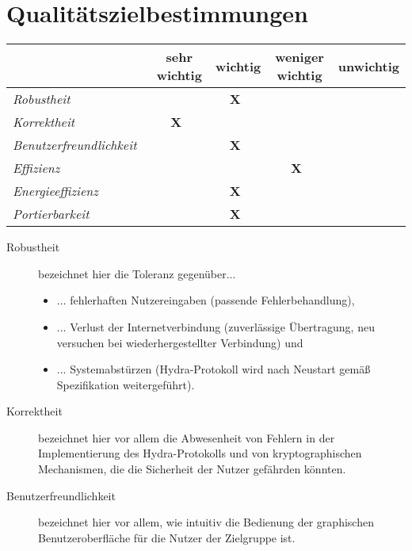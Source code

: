 \section{Qualitätszielbestimmungen}

\begin{center}
 \begin{tabular}{l|c|c|c|c}
  ~ & sehr wichtig & wichtig & weniger wichtig & unwichtig\\
  \hline \hline
  \textit{Robustheit}~ &  ~ ~ ~ & \textbf{X}~ &  ~ ~ ~ &  ~ ~ ~ \\
  \hline
  \textit{Korrektheit}~ & \textbf{X}~ &  ~ ~ ~ &  ~ ~ ~ &  ~ ~ ~ \\
  \hline
  \textit{Benutzerfreundlichkeit}~ &  ~ ~ ~ & \textbf{X}~ &  ~ ~ ~ &  ~ ~ ~ \\
  \hline
  \textit{Effizienz}~ &  ~ ~ ~ &  ~ ~ ~ & \textbf{X}~ &  ~ ~ ~ \\
  \hline
  \textit{Energieeffizienz}~ &  ~ ~ ~ & \textbf{X}~ &  ~ ~ ~ &  ~ ~ ~ \\
  \hline
  \textit{Portierbarkeit}~ &  ~ ~ ~ & \textbf{X}~ &  ~ ~ ~ &   ~ ~ ~ \\
 \end{tabular}

    \begin{description}
        \item[Robustheit]
            bezeichnet hier die Toleranz gegenüber...
            
\begin{itemize}

            \item ... fehlerhaften Nutzereingaben (passende Fehlerbehandlung),
            \item ... Verlust der Internetverbindung (zuverlässige Übertragung, neu versuchen bei wiederhergestellter Verbindung)
            und 
            \item ... Systemabstürzen (Hydra-Protokoll wird nach Neustart gemäß Spezifikation weitergeführt).
\end{itemize}            


        \item[Korrektheit]
            bezeichnet hier vor allem die Abwesenheit von Fehlern in der Implementierung des Hydra-Protokolls
            und von kryptographischen Mechanismen, die die Sicherheit der Nutzer gefährden könnten.

        \item[Benutzerfreundlichkeit]
            bezeichnet hier vor allem, wie intuitiv die
            Bedienung der graphischen Benutzeroberfläche für die Nutzer der Zielgruppe ist.


\end{description}
\end{center}
